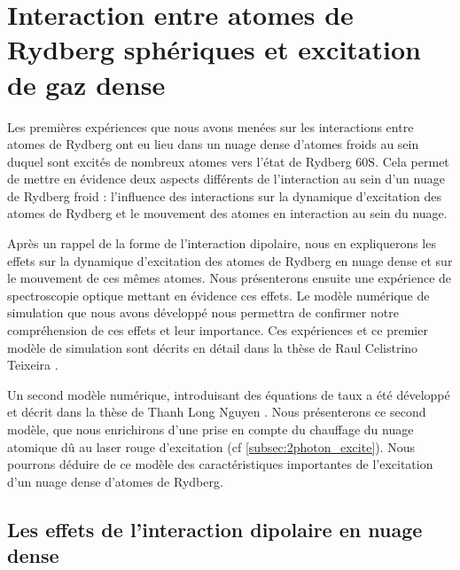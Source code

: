 \chapter{Interaction entre atomes de Rydberg sphériques et excitation de gaz dense}
\label{chapter:60s}
\vfill
\minitoc
\newpage

\noindent Les premières expériences que nous avons menées sur les interactions entre atomes de Rydberg ont eu lieu dans un nuage dense d'atomes froids au sein duquel sont excités de nombreux atomes vers l'état de Rydberg $\mathrm{60S}$.
Cela permet de mettre en évidence deux aspects différents de l'interaction au sein d'un nuage de Rydberg froid : l'influence des interactions sur la dynamique d'excitation des atomes de Rydberg et le mouvement des atomes en interaction au sein du nuage.

Après un rappel de la forme de l'interaction dipolaire, nous en expliquerons les effets sur la dynamique d'excitation des atomes de Rydberg en nuage dense et sur le mouvement de ces mêmes atomes.
Nous présenterons ensuite une expérience de spectroscopie optique mettant en évidence ces effets.
Le modèle numérique de simulation que nous avons développé nous permettra de confirmer notre compréhension de ces effets et leur importance.
Ces expériences et ce premier modèle de simulation sont décrits en détail dans la thèse de Raul Celistrino Teixeira \cite{PHD_CELISTRINO}.

Un second modèle numérique, introduisant des équations de taux a été développé et décrit dans la thèse de Thanh Long Nguyen \cite{PHD_NGUYEN}.
Nous présenterons ce second modèle, que nous enrichirons d'une prise en compte du chauffage du nuage atomique dû au laser rouge d'excitation (cf \ref{subsec:2photon_excite}).
Nous pourrons déduire de ce modèle des caractéristiques importantes de l'excitation d'un nuage dense d'atomes de Rydberg.

\section{Les effets de l'interaction dipolaire en nuage dense}


